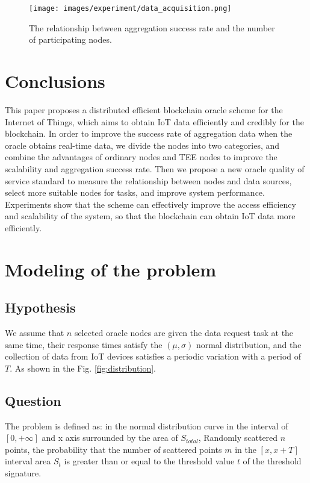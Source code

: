\documentclass[paper]{ieice}
\begin{document}
 \begin{figure}[h!]
    \centering
    \texttt{[image: images/experiment/data\_acquisition.png]}
    \caption{The relationship between aggregation success rate and the number of participating nodes.}
    \label{fig:data_acquisition}
\end{figure}


\section{Conclusions}
\label{conclusion}
This paper proposes a distributed efficient blockchain oracle scheme for the Internet of Things, which aims to obtain IoT data efficiently and credibly for the blockchain. In order to improve the success rate of aggregation data when the oracle obtains real-time data, we divide the nodes into two categories, and combine the advantages of ordinary nodes and TEE nodes to improve the scalability and aggregation success rate. Then we propose a new oracle quality of service standard to measure the relationship between nodes and data sources, select more suitable nodes for tasks, and improve system performance. Experiments show that the scheme can effectively improve the access efficiency and scalability of the system, so that the blockchain can obtain IoT data more efficiently. 

\appendix
\section{Modeling of the problem}
\label{model}
    \subsection{Hypothesis}
    We assume that $n$ selected oracle nodes are given the data request task at the same time, their response times satisfy the $(\mu,\sigma)$ normal distribution, and the collection of data from IoT devices satisfies a periodic variation with a period of $T$\cite{fraleigh2003provisioning}. As shown in the Fig. \ref{fig:distribution}.

    \subsection{Question}
     The problem is defined as: in the normal distribution curve in the interval of $[0,+\infty]$ and x axis surrounded by the area of $S_{total}$, Randomly scattered $n$ points, the probability that the number of scattered points $m$ in the $[x,x+T]$ interval area $S_{t}$ is greater than or equal to the threshold value $t$ of the threshold signature.
\end{document}
